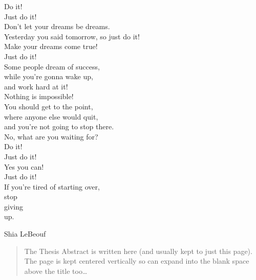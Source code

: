 \documentclass[
11pt, %
english, %
doublespacing, %
headsepline, %
]{MastersDoctoralThesis} %
\begin{document}
\vspace*{0.02\textheight} %
{\itshape \begin{center}
Do it! \\Just do it!
\linebreak \\
Don't let your dreams be dreams.\\Yesterday you said tomorrow, so just do it!\\Make your dreams come true!\\Just do it!
\linebreak \\
Some people dream of success,\\while you're gonna wake up,\\ and work hard at it!\\Nothing is impossible!
\linebreak \\ 
You should get to the point,\\where anyone else would quit,\\and you're not going to stop there.\\No, what are you waiting for?
\linebreak \\
Do it!\\Just do it!\\Yes you can!\\Just do it!
\linebreak \\
If you're tired of starting over,\\stop\\giving\\up.
\end{center}}\bigbreak

\hfill Shia LeBeouf %




\begin{abstract}
\addchaptertocentry{\abstractname} %
The Thesis Abstract is written here (and usually kept to just this page). The page is kept centered vertically so can expand into the blank space above the title too\ldots
\end{abstract}
\end{document}
